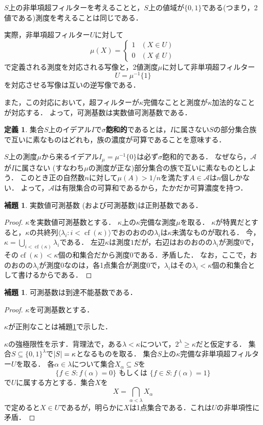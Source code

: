 \documentclass[uplatex]{jsarticle}
\newcommand{\cf}{\operatorname{cf}}
\newcommand{\seq}[1]{{\langle#1\rangle}}
\DeclarePairedDelimiter\abs{\lvert}{\rvert}
\renewcommand\subset{\subseteq}
\theoremstyle{definition}
\newtheorem{defi}[thm]{定義}
\newtheorem{lem}[thm]{補題}
\begin{document}
	$S$上の非単項超フィルターを考えることと，$S$上の値域が$\{0, 1\}$である(つまり，2値である)測度を考えることは同じである．
	
	実際，非単項超フィルター$U$に対して
	\[\mu(X) = \begin{cases}1 & (X \in U)\\ 0 & (X \not \in U) \end{cases}\]
	で定義される測度を対応される写像と，2値測度$\mu$に対して非単項超フィルター
	\[U = \mu^{-1}\{1\}\]
	を対応させる写像は互いの逆写像である．
	
	また，この対応において，超フィルターが$\kappa$完備なことと測度が$\kappa$加法的なことが対応する．
	よって，可測基数は実数値可測基数である．
	
	\begin{defi}
		集合$S$上のイデアル$I$で\textbf{$\sigma$飽和的}であるとは，$I$に属さない$S$の部分集合族で互いに素なものはどれも，族の濃度が可算であることを意味する．
	\end{defi}
	
	$S$上の測度$\mu$から来るイデアル$I_\mu = \mu^{-1}\{0\}$は必ず$\sigma$飽和的である．
	なぜなら，$\mathcal{A}$が$I$に属さない (すなわち$\mu$の測度が正な)部分集合の族で互いに素なものとしよう．
	このとき正の自然数$n$に対して$\mu(A) > 1/n$を満たす$A \in \mathcal{A}$は$n$個しかない．
	よって，$\mathcal{A}$は有限集合の可算和であるから，たかだか可算濃度を持つ．
	
	\begin{lem}\label{lem:measisreg}
		実数値可測基数 (および可測基数)は正則基数である．
	\end{lem}
	\begin{proof}
		$\kappa$を実数値可測基数とする．
		$\kappa$上の$\kappa$完備な測度$\mu$を取る．
		$\kappa$が特異だとすると，$\kappa$の共終列$\seq{\lambda_i : i < \cf(\kappa) }$でおのおのの$\lambda_i$は$\kappa$未満なものが取れる．
		今，$\kappa = \bigcup_{i < \cf(\kappa)} \lambda_i$である．
		左辺$\kappa$は測度$1$だが，右辺はおのおのの$\lambda_i$が測度$0$で，その$\cf(\kappa) < \kappa$個の和集合だから測度$0$である．矛盾した．
		なお，ここで，おのおのの$\lambda_i$が測度$0$なのは，各1点集合が測度$0$で，$\lambda_i$はその$\lambda_i < \kappa$個の和集合として書けるからである．
	\end{proof}

	\begin{lem}\label{lem:measisinacc}
		可測基数は到達不能基数である．
	\end{lem}
	\begin{proof}
		$\kappa$を可測基数とする．
		
		$\kappa$が正則なことは補題\ref{lem:measisreg}で示した．
		
		$\kappa$の強極限性を示す．背理法で，ある$\lambda < \kappa$について，$2^\lambda \ge \kappa$だと仮定する．
		集合$S \subset \{0, 1\}^\lambda$で$\abs{S} = \kappa$となるものを取る．
		集合$S$上の$\kappa$完備な非単項超フィルター$U$を取る．
		各$\alpha \in \lambda$について集合$X_\alpha \subset S$を
		\[
		\{ f \in S : f(\alpha) = 0 \} \text{ もしくは } \{ f \in S : f(\alpha) = 1 \}
		\]
		で$U$に属する方とする．集合$X$を
		\[
		X = \bigcap_{\alpha < \lambda} X_\alpha
		\]
		で定めると$X \in U$であるが，明らかに$X$は1点集合である．これは$U$の非単項性に矛盾．
	\end{proof}
	
\end{document}
